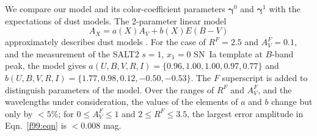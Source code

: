 \documentclass{aastex61}   	%
\begin{document}
We compare our model and its color-coefficient parameters $\pmb{\gamma}^0$ and $\pmb{\gamma}^1$ with the expectations of  dust models.
The 2-parameter linear model
\begin{equation}
A_X = a(X)  A_V + b(X) E(B-V)
\label{f99:eqn}
\end{equation}
approximately describes dust models \citep[e.g][]{1989ApJ...345..245C}.
For the case of
$R^F=2.5$ and $A^F_V=0.1$,
and the measurement of the SALT2
\citet{2007A&A...466...11G} $s=1$, $x_1=0$ SN~Ia template at $B$-band peak, the  model
gives
$a(U,B,V,R,I)=\{0.96,   1.00,   1.00,   0.97,   0.77\}$ and $b(U,B,V,R,I)=\{  1.77,   0.98,   0.12,  -0.50,  -0.53\}$.
The $F$ superscript is added to distinguish parameters of the  model.
Over the ranges of
 $R^F$ and $A^F_V$,
and the wavelengths under consideration,  the values of the elements of $a$ and $b$ change but only by $<5$\%;
\color{red}
for $0\le A^F_V\le 1$ and $2 \le R^F \le 3.5$, the largest error amplitude in Eqn.~\ref{f99:eqn} is $<0.008$ mag.
\color{black}
\end{document}

